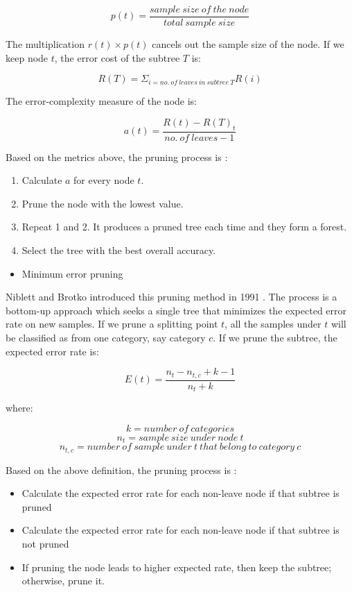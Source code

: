 \documentclass[
  12pt,
]{krantz}
\providecommand{\tightlist}{%
  \setlength{\itemsep}{0pt}\setlength{\parskip}{0pt}}
\begin{document}
\[p(t)=\frac{ sample\ size\ of\ the\ node}{total\ sample\ size}\]

The multiplication \(r(t)\times p(t)\) cancels out the sample size of the node. If we keep node \(t\), the error cost of the subtree \(T\) is:

\[R(T)=\Sigma_{i = no.\ of\ leaves\ in\ subtree\ T} R(i)\]

The error-complexity measure of the node is:

\[a(t)=\frac{R(t)-R(T)_{t}}{no.\ of\ leaves - 1}\]

Based on the metrics above, the pruning process is \citep{Nikita2012}:

\begin{enumerate}
\def\labelenumi{\arabic{enumi}.}
\tightlist
\item
  Calculate \(a\) for every node \(t\).
\item
  Prune the node with the lowest value.
\item
  Repeat 1 and 2. It produces a pruned tree each time and they form a forest.
\item
  Select the tree with the best overall accuracy.
\end{enumerate}

\begin{itemize}
\tightlist
\item
  Minimum error pruning
\end{itemize}

Niblett and Brotko introduced this pruning method in 1991 \citep{Cestnik1991}. The process is a bottom-up approach which seeks a single tree that minimizes the expected error rate on new samples. If we prune a splitting point \(t\), all the samples under \(t\) will be classified as from one category, say category \(c\). If we prune the subtree, the expected error rate is:

\[E(t)=\frac{n_{t}-n_{t,c}+k-1}{n_{t}+k}\]

where:

\[k=number\ of\ categories\]
\[n_{t}=sample\ size\ under\ node\ t\]
\[n_{t,c}= number\ of\ sample\ under\ t\ that\ belong\ to\ category\ c\]

Based on the above definition, the pruning process is \citep{Espoito1997}:

\begin{itemize}
\tightlist
\item
  Calculate the expected error rate for each non-leave node if that subtree is pruned
\item
  Calculate the expected error rate for each non-leave node if that subtree is not pruned
\item
  If pruning the node leads to higher expected rate, then keep the subtree; otherwise, prune it.
\end{itemize}
\end{document}
